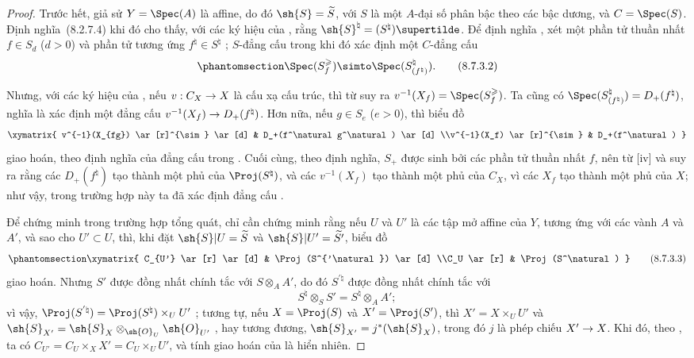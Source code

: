 \documentclass[oneside,10pt]{amsart}
\makeatletter
\renewcommand{\geq}{\geqslant}
\newcommand{\ega@arrow}[2]{\mathchoice{#1}{#2}{#2}{#2}}
\renewcommand{\to}{\ega@arrow{\longrightarrow}{\rightarrow}}
\newcommand{\oldpage}[2][]{\marginnote{\normalfont\footnotesize\textbf{#1}~|~#2}\ignorespaces}
\let\EGAOriginalLabel\label
\renewcommand{\label}[1]{\phantomsection\EGAOriginalLabel{#1}}
\makeatother
\begin{document}
\begin{proof}
Trước hết, giả sử $Y=\Spec(A)$ là affine, do đó $\sh{S}=\widetilde{S}$, với $S$ là một $A$-đại số phân bậc theo các bậc dương, và $C=\Spec(S)$.
Định nghĩa~\textup{(8.2.7.4)} khi đó cho thấy, với các ký hiệu của , rằng $\sh{S}^\natural=(S^\natural)\supertilde$.
Để định nghĩa , xét một phần tử thuần nhất $f\in S_d$ ($d>0$) và phần tử tương ứng $f^\natural\in S^\natural$ ;
$S$-đẳng cấu trong  khi đó xác định một $C$-đẳng cấu
\[
\label{II.8.7.3.2}
  \Spec(S_f^\geq) \simto \Spec(S_{(f^\natural)}^\natural).
\tag{8.7.3.2}
\]

\oldpage[II]{175}
Nhưng, với các ký hiệu của , nếu $v:C_X\to X$ là cấu xạ cấu trúc, thì từ  suy ra $v^{-1}(X_f)=\Spec(S_f^\geq)$.
Ta cũng có $\Spec(S_{(f^\natural)}^\natural)=D_+(f^\natural)$, nghĩa là  xác định một đẳng cấu $v^{-1}(X_f)\to D_+(f^\natural)$.
Hơn nữa, nếu $g\in S_e$ ($e>0$), thì biểu đồ
\[
  \xymatrix{
    v^{-1}(X_{fg})
      \ar[r]^{\sim}
      \ar[d]
  & D_+(f^\natural g^\natural)
      \ar[d]
  \\v^{-1}(X_f)
      \ar[r]^{\sim}
  & D_+(f^\natural)
  }
\]
giao hoán, theo định nghĩa của đẳng cấu trong .
Cuối cùng, theo định nghĩa, $S_+$ được sinh bởi các phần tử thuần nhất $f$, nên từ [iv] và  suy ra rằng các $D_+(f^\natural)$ tạo thành một phủ của $\Proj(S^\natural)$, và các $v^{-1}(X_f)$ tạo thành một phủ của $C_X$, vì các $X_f$ tạo thành một phủ của $X$;
như vậy, trong trường hợp này ta đã xác định đẳng cấu .

Để chứng minh  trong trường hợp tổng quát, chỉ cần chứng minh rằng nếu $U$ và $U'$ là các tập mở affine của $Y$, tương ứng với các vành $A$ và $A'$, và sao cho $U'\subset U$, thì, khi đặt $\sh{S}|U=\widetilde{S}$ và $\sh{S}|U'=\widetilde{S'}$, biểu đồ
\[
\label{II.8.7.3.3}
  \xymatrix{
    C_{U'}
      \ar[r]
      \ar[d]
  & \Proj(S^{'\natural})
      \ar[d]
  \\C_U
      \ar[r]
  & \Proj(S^\natural)
  }
\tag{8.7.3.3}
\]
giao hoán.
Nhưng $S'$ được đồng nhất chính tắc với $S\otimes_A A'$, do đó $S^{'\natural}$ được đồng nhất chính tắc với
\[
  S^\natural \otimes_S S' = S^\natural \otimes_A A';
\]
vì vậy, $\Proj(S^{'\natural}) = \Proj(S^\natural)\times_U U'$ ;
tương tự, nếu $X=\Proj(S)$ và $X'=\Proj(S')$, thì $X'=X\times_U U'$ và $\sh{S}_{X'}=\sh{S}_X\otimes_{\sh{O}_U}\sh{O}_{U'}$ , hay tương đương, $\sh{S}_{X'}=j^*(\sh{S}_X)$, trong đó $j$ là phép chiếu $X'\to X$.
Khi đó, theo , ta có $C_{U'} = C_U\times_X X' = C_U\times_U U'$, và tính giao hoán của  là hiển nhiên.
\end{proof}
\end{document}
